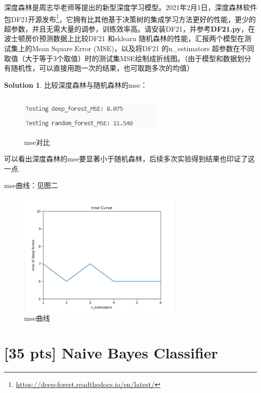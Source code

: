 \documentclass[a4paper,UTF8]{article}
\theoremstyle{definition}
\newtheorem*{solution}{Solution}
\begin{document}
\par 深度森林是周志华老师等提出的新型深度学习模型。2021年2月1日，深度森林软件包DF21开源发布\footnote{\url{https://deep-forest.readthedocs.io/en/latest/}}，它拥有比其他基于决策树的集成学习方法更好的性能，更少的超参数，并且无需大量的调参，训练效率高。请安装DF21，并参考\textbf{DF21.py}，在波士顿房价预测数据上比较DF21 和sklearn 随机森林的性能，汇报两个模型在测试集上的Mean Square Error (MSE)，以及将DF21 的n\_estimators 超参数在不同取值（大于等于3个取值）时的测试集MSE绘制成折线图。（由于模型和数据划分有随机性，可以直接用跑一次的结果，也可取跑多次的均值）

\begin{solution}
	比较深度森林与随机森林的mse：
	\begin{figure}[h]
		\centering
		\includegraphics[width=7cm,height=2cm]{mse_deep_random.png}
		\caption{mse对比}
	\end{figure}
	可以看出深度森林的mse要显著小于随机森林，后续多次实验得到结果也印证了这一点.

	mse曲线：见图二
	\begin{figure}[t]
		\centering
		\includegraphics[width=8cm,height=6cm]{mse_curve.png}
		\caption{mse曲线}
	\end{figure}
\end{solution}

\section{[35 pts] Naive Bayes Classifier}
\end{document}

